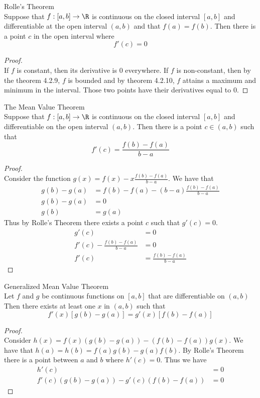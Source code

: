 \documentclass[a4paper]{article}
\begin{document}
\begin{thm}{Rolle's Theorem}{}\\ Suppose that $f:[a,b]\to\R$ is continuous on the closed interval $[a,b]$ and differentiable at the open interval $(a,b)$ and that $f(a)=f(b)$. Then there is a point $c$ in the open interval where $$f'(c)=0$$ 
\begin{proof}\\ If $f$ is constant, then its derivative is $0$ everywhere. If $f$ is non-constant, then by the theorem 4.2.9, $f$ is bounded and by theorem 4.2.10, $f$ attains a maximum and minimum in the interval. Those two points have their derivatives equal to $0$. 
\end{proof}
\end{thm}

\begin{thm}{The Mean Value Theorem}{}\\ Suppose that $f:[a,b]\to\R$ is continuous on the closed interval $[a,b]$ and differentiable on the open interval $(a,b)$. Then there is a point $c\in(a,b)$ such that $$f'(c)=\frac{f(b)-f(a)}{b-a}$$ 
\begin{proof}\\ Consider the function $g(x)=f(x)-x\frac{f(b)-f(a)}{b-a}$. We have that 
\begin{align*}
g(b)-g(a)&=f(b)-f(a)-(b-a)\frac{f(b)-f(a)}{b-a}\\
g(b)-g(a)&=0\\
g(b)&=g(a)
\end{align*} Thus by Rolle's Theorem there exists a point $c$ such that $g'(c)=0$. 
\begin{align*}
g'(c)&=0\\
f'(c)-\frac{f(b)-f(a)}{b-a}&=0\\
f'(c)&=\frac{f(b)-f(a)}{b-a}
\end{align*}
\end{proof}
\end{thm}

\begin{thm}{Generalized Mean Value Theorem}{}\\ Let $f$ and $g$ be continuous functions on $[a,b]$ that are differentiable on $(a,b)$ Then there exists at least one $x$ in $(a,b)$ such that $$f'(x)[g(b)-g(a)]=g'(x)[f(b)-f(a)]$$
\begin{proof}\\ Consider $h(x)=f(x)(g(b)-g(a))-(f(b)-f(a))g(x)$. We have that $h(a)=h(b)=f(a)g(b)-g(a)f(b)$. By Rolle's Theorem there is a point between $a$ and $b$ where $h'(c)=0$. Thus we have 
\begin{align*}
h'(c)&=0\\
f'(c)(g(b)-g(a))-g'(c)(f(b)-f(a))&=0
\end{align*}
\end{proof}
\end{thm}
\end{document}
